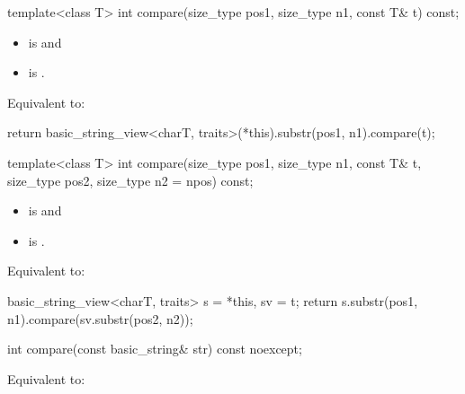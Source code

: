%
\begin{itemdecl}
template<class T>
  int compare(size_type pos1, size_type n1, const T& t) const;
\end{itemdecl}

\begin{itemdescr}
\pnum
\constraints
\begin{itemize}
\item
{} is
 and
\item
{} is
.
\end{itemize}

\pnum
\effects
Equivalent to:
\begin{codeblock}
return basic_string_view<charT, traits>(*this).substr(pos1, n1).compare(t);
\end{codeblock}
\end{itemdescr}

%
\begin{itemdecl}
template<class T>
  int compare(size_type pos1, size_type n1, const T& t, size_type pos2, size_type n2 = npos) const;
\end{itemdecl}

\begin{itemdescr}
\pnum
\constraints
\begin{itemize}
\item
{} is
 and
\item
{} is
.
\end{itemize}

\pnum
\effects
Equivalent to:
\begin{codeblock}
basic_string_view<charT, traits> s = *this, sv = t;
return s.substr(pos1, n1).compare(sv.substr(pos2, n2));
\end{codeblock}
\end{itemdescr}

%
\begin{itemdecl}
int compare(const basic_string& str) const noexcept;
\end{itemdecl}

\begin{itemdescr}
\pnum
\effects
Equivalent to:
\end{itemdescr}

